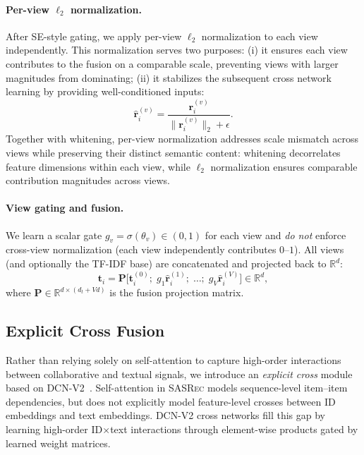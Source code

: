 \documentclass[sigconf,natbib=true]{acmart}
\newcommand{\base}{\textsc{SASRec}\xspace}
\newcommand{\tfidf}{\textsc{TF-IDF}\xspace}
\begin{document}
\paragraph{Per-view $\ell_2$ normalization.}
After SE-style gating, we apply per-view $\ell_2$ normalization
to each view independently. This normalization serves two purposes:
(i) it ensures each view contributes to the fusion on a comparable
scale, preventing views with larger magnitudes from dominating;
(ii) it stabilizes the subsequent cross network learning by
providing well-conditioned inputs:
\begin{equation}
  \hat{\mathbf{r}}_i^{(v)} = \frac{\mathbf{r}_i^{(v)}}{\lVert \mathbf{r}_i^{(v)} \rVert_2 + \epsilon}.
\end{equation}
Together with whitening, per-view normalization addresses scale mismatch
across views while preserving their distinct semantic content: whitening
decorrelates feature dimensions within each view, while $\ell_2$
normalization ensures comparable contribution magnitudes across views.

\paragraph{View gating and fusion.}
We learn a scalar gate $g_v=\sigma(\theta_v)\in(0,1)$ for each
view and \emph{do not} enforce cross-view normalization (each
view independently contributes $0$--$1$). All views (and
optionally the \tfidf base) are concatenated and projected
back to $\mathbb{R}^d$:
\begin{equation}
  \mathbf{t}_i = \mathbf{P}\Big[\mathbf{t}_i^{(0)};\; g_1\hat{\mathbf{r}}_i^{(1)};\; \dots;\; g_V\hat{\mathbf{r}}_i^{(V)}\Big] \in \mathbb{R}^d,
\end{equation}
where $\mathbf{P} \in \mathbb{R}^{d \times (d_t + Vd)}$ is the fusion projection matrix.

\subsection{Explicit Cross Fusion}
Rather than relying solely on self-attention to capture
high-order interactions between collaborative and textual
signals, we introduce an \emph{explicit cross} module based on
DCN-V2~\cite{wang2021dcnv2}. Self-attention in \base models
sequence-level item--item dependencies, but does not
explicitly model feature-level crosses between ID embeddings
and text embeddings. DCN-V2 cross networks fill this gap by
learning high-order ID$\times$text interactions through
element-wise products gated by learned weight matrices.
\end{document}
